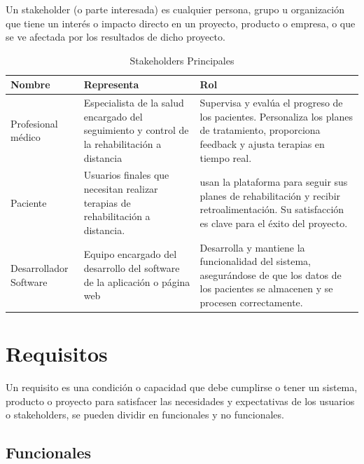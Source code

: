 \documentclass{article}
\begin{document}
	Un stakeholder (o parte interesada) es cualquier persona, grupo u organización que tiene un interés o impacto directo en un proyecto, producto o empresa, o que se ve afectada por los resultados de dicho proyecto. 
	
	\begin{table}[ht]
		\centering
		\caption{Stakeholders Principales}
		\begin{tabular}{@{} p{3cm} p{6cm} p{7cm} @{}}
			\toprule
			\textbf{Nombre} & \textbf{Representa} & \textbf{Rol} \\
			\midrule
			Profesional médico & 
			Especialista de la salud encargado del seguimiento y control de la rehabilitación a distancia & 
			Supervisa y evalúa el progreso de los pacientes. \newline Personaliza los planes de tratamiento, proporciona feedback y ajusta terapias en tiempo real. \\
			
			\addlinespace
			
			Paciente & 
			Usuarios finales que necesitan realizar terapias de rehabilitación a distancia. & 
			usan la plataforma para seguir sus planes de rehabilitación y recibir retroalimentación. Su satisfacción es clave para el éxito del proyecto. \\
			
			\addlinespace
			
			Desarrollador  Software & 
			Equipo encargado del desarrollo del software de la aplicación o página web & 
			Desarrolla y mantiene la funcionalidad del sistema, asegurándose de que los datos de los pacientes se almacenen y se procesen correctamente. \\
			\bottomrule
		\end{tabular}
	\end{table}
	
	

	
	
	\section{Requisitos}
	
	Un requisito es una condición o capacidad que debe cumplirse o tener un sistema, producto o proyecto para satisfacer las necesidades y expectativas de los usuarios o stakeholders, se pueden dividir en funcionales y no funcionales.
	
	\subsection{Funcionales}
	
\end{document}
